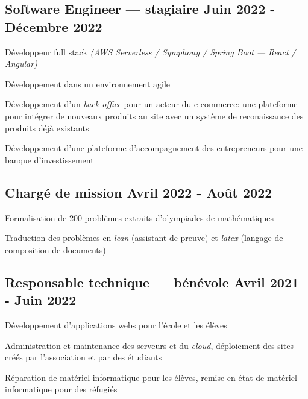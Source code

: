\subsection{{Software Engineer --- stagiaire \hfill Juin 2022 - Décembre 2022}}
\begin{zitemize}
    \item Développeur full stack \textit{(AWS Serverless / Symphony / Spring Boot --- React / Angular)}
    \item Développement dans un environnement agile
    \item Développement d'un \textit{back-office} pour un acteur du e-commerce: une plateforme pour intégrer de nouveaux produits au site avec un système de reconaissance des produits déjà existants
    \item Développement d'une plateforme d'accompagnement des entrepreneurs pour une banque d'investissement
\end{zitemize}
\vspace{0.1cm}

\subsection{{Chargé de mission \hfill Avril 2022 - Août 2022}}
\begin{zitemize}
    \item Formalisation de 200 problèmes extraits d'olympiades de mathématiques
    \item Traduction des problèmes en \textit{lean} (assistant de preuve) et \textit{latex} (langage de composition de documents)
\end{zitemize}
\vspace{0.1cm}

\subsection{{Responsable technique --- bénévole \hfill Avril 2021 - Juin 2022}}
\begin{zitemize}
    \item Développement d'applications webs pour l'école et les élèves
    \item Administration et maintenance des serveurs et du \textit{cloud}, déploiement des sites créés par l'association et par des étudiants
    \item Réparation de matériel informatique pour les élèves, remise en état de matériel informatique pour des réfugiés
\end{zitemize}
\vspace{0.1cm}
